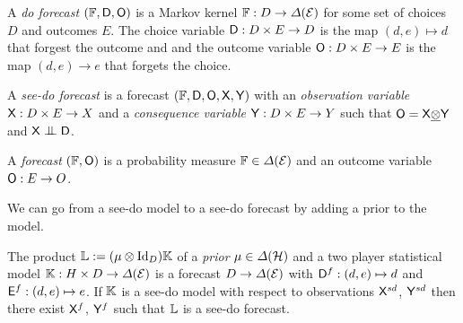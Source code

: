 \begin{definition}
A \emph{do forecast} $(\mathbb{F},\mathsf{D},\mathsf{O})$ is a Markov kernel $\mathbb{F}:D\to \Delta(\mathcal{E})$ for some set of choices $D$ and outcomes $E$. The choice variable $\mathsf{D}:D\times E\to D$ is the map $(d,e)\mapsto d$ that forgest the outcome and and the outcome variable $\mathsf{O}:D\times E\to E$ is the map $(d,e)\to e$ that forgets the choice.

A \emph{see-do forecast} is a forecast $(\mathbb{F},\mathsf{D},\mathsf{O},\mathsf{X},\mathsf{Y})$ with an \emph{observation variable} $\mathsf{X}:D\times E\to X$ and a \emph{consequence variable} $\mathsf{Y}:D\times E\to Y$ such that $\mathsf{O}=\mathsf{X}\underline{\otimes}\mathsf{Y}$ and $\RV{X}\CI\RV{D}$.

A \emph{forecast} $(\mathbb{F},\mathsf{O})$ is a probability measure $\mathbb{F}\in\Delta(\mathcal{E})$ and an outcome variable $\mathsf{O}:E\to O$.
\end{definition}

We can go from a see-do model to a see-do forecast by adding a prior to the model.

\begin{theorem}
The product $\mathbb{L}:=(\mu\otimes \mathrm{Id}_D)\mathbb{K}$ of a \emph{prior} $\mu\in \Delta(\mathcal{H})$ and a two player statistical model $\mathbb{K}:H\times D\to \Delta(\mathcal{E})$ is a forecast $D\to \Delta(\mathcal{E})$ with $\mathsf{D}^f:(d,e)\mapsto d$ and $\mathsf{E}^f:(d,e)\mapsto e$. If $\mathbb{K}$ is a see-do model with respect to observations $\mathsf{X}^{sd}$, $\mathsf{Y}^{sd}$ then there exist $\mathsf{X}^{f}$, $\mathsf{Y}^f$ such that $\mathbb{L}$ is a see-do forecast.
\end{theorem}


